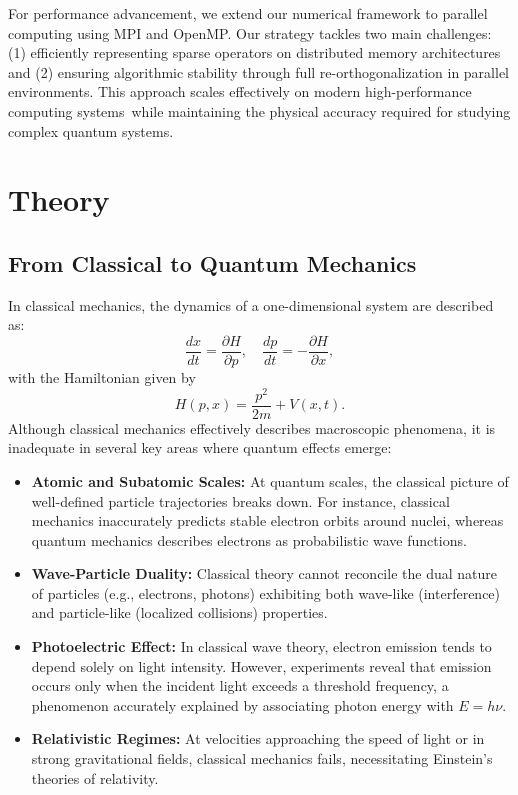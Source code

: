 \documentclass[12pt,a4paper]{report}
\begin{document}
For performance advancement, we extend our numerical framework to parallel computing using MPI and OpenMP. Our strategy tackles two main challenges: (1) efficiently representing sparse operators on distributed memory architectures and (2) ensuring algorithmic stability through full re-orthogonalization in parallel environments. This approach scales effectively on modern high-performance computing systems while maintaining the physical accuracy required for studying complex quantum systems.


\chapter{Theory}

\section{From Classical to Quantum Mechanics}
In classical mechanics, the dynamics of a one-dimensional system are described as:
\begin{equation}
    \frac{dx}{dt} = \frac{\partial H}{\partial p}, \quad \frac{dp}{dt} = -\frac{\partial H}{\partial x},
\end{equation}
with the Hamiltonian given by
\begin{equation}
    H(p,x) = \frac{p^2}{2m} + V(x, t).
\end{equation}
Although classical mechanics effectively describes macroscopic phenomena, it is inadequate in several key areas where quantum effects emerge:
\begin{itemize}
    \item \textbf{Atomic and Subatomic Scales:} At quantum scales, the classical picture of well-defined particle trajectories breaks down. For instance, classical mechanics inaccurately predicts stable electron orbits around nuclei, whereas quantum mechanics describes electrons as probabilistic wave functions.
    \item \textbf{Wave-Particle Duality:} Classical theory cannot reconcile the dual nature of particles (e.g., electrons, photons) exhibiting both wave-like (interference) and particle-like (localized collisions) properties.
    \item \textbf{Photoelectric Effect:} In classical wave theory, electron emission tends to depend solely on light intensity. However, experiments reveal that emission occurs only when the incident light exceeds a threshold frequency, a phenomenon accurately explained by associating photon energy with $E=h\nu$.
    \item \textbf{Relativistic Regimes:} At velocities approaching the speed of light or in strong gravitational fields, classical mechanics fails, necessitating Einstein’s theories of relativity.
\end{itemize}
\end{document}
